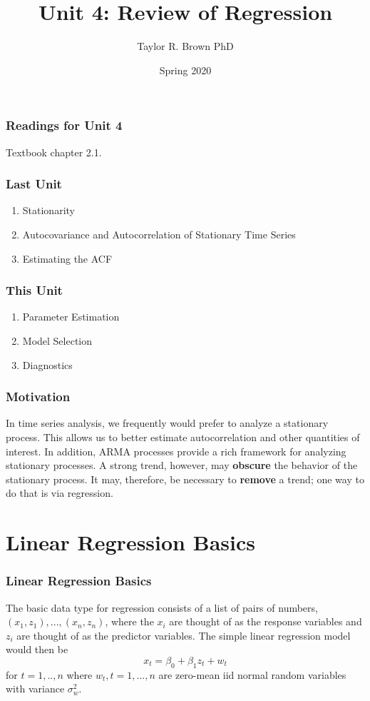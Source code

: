 \documentclass[%
xcolor=pdftex]{beamer}
\title{Unit 4: Review of Regression}
\author[STAT 5170: Applied Time Series, Unit 4]{Taylor R. Brown PhD}
\institute{Department of Statistics, University of Virginia}
\date{Spring 2020}
\begin{document}
\frame{\titlepage}


\begin{frame}
\frametitle{Readings for Unit 4}

Textbook chapter 2.1.

\end{frame}

\begin{frame}
\frametitle{Last Unit}
\begin{enumerate}
\item Stationarity
\item Autocovariance and Autocorrelation of Stationary Time Series
\item Estimating the ACF
\end{enumerate}\end{frame}

\begin{frame}
\frametitle{This Unit}
\begin{enumerate}
\item Parameter Estimation
\item Model Selection
\item Diagnostics
\end{enumerate}
\end{frame}

\begin{frame}
\frametitle{Motivation}
In time series analysis, we frequently would prefer to analyze a stationary process.  This allows us to better estimate autocorrelation and other quantities of interest.  In addition,  ARMA processes provide a rich framework for analyzing stationary processes. A strong trend, however, may \textbf{obscure} the behavior of the stationary process. It may, therefore, be necessary to \textbf{remove} a trend; one way to do that is via regression.

\end{frame}

\section{Linear Regression Basics}
\frame{\tableofcontents[currentsection]}

\begin{frame}
\frametitle{Linear Regression Basics}

The basic data type for regression consists of a list of pairs of numbers, $(x_1,z_1),..., (x_n, z_n)$, where the $x_i$ are thought of as the response variables and $z_i$ are thought of as the predictor variables.  The simple linear regression model would then be
$$
x_t= \beta_0 + \beta_1 z_t + w_t
$$
for $t=1,..,n$ where $w_t, t=1,...,n$ are zero-mean iid normal random variables with variance $\sigma_w^2$.


\end{frame}
\end{document}
